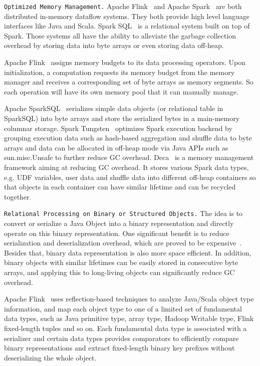 \vspace{5pt}
\texttt {Optimized Memory Management.} 
Apache Flink~\cite{alexandrov2014stratosphere} and Apache
Spark~\cite{zaharia2012resilient} are both distributed in-memory
dataflow systems. They both provide high level language interfaces like Java and Scala.
Spark SQL~\cite{armbrust2015spark} is a relational system built on top
of Spark. Those systems all have the
ability to alleviate the garbage collection overhead  by storing data
into byte arrays or even storing data off-heap.

Apache Flink~\cite{alexandrov2014stratosphere} assigns memory budgets to its data processing operators. Upon
initialization, a computation requests its memory budget from the
memory manager and receives a corresponding set of byte arrays as memory segments. So
each operation will have its own memory pool that it can manually
manage. 

Apache SparkSQL~\cite{armbrust2015spark} serializes simple data objects (or
relational table in SparkSQL) into byte arrays and store the serialized bytes
in a main-memory columnar storage. Spark Tungsten~\cite{tungsten}
optimizes Spark execution backend by grouping execution
data such as hash-based aggregation and shuffle data
to byte arrays and data can be allocated in off-heap mode via
Java APIs such as sun.misc.Unsafe to
further reduce GC overhead. Deca~\cite{lu2016lifetime} is a memory management framework aiming at
reducing GC overhead. It stores
various Spark data types, e.g. UDF variables, user data and
shuffle data into different
off-heap containers so that objects in each container can have similar
lifetime and can be recycled together.

\vspace{5pt}
\texttt {Relational Processing on Binary or Structured Objects.} The idea is to convert or
serialize a Java Object into a binary representation and directly
operate on this binary representation. One significant benefit is to reduce serialization and
deserialization overhead, which are proved to be expensive~\cite{ousterhout2015making}. 
Besides that, binary data representation is also more space efficient. In addition, binary objects
with similar lifetimes can be easily stored in consecutive byte
arrays, and applying this to long-living objects can significantly reduce GC overhead.

Apache Flink~\cite{alexandrov2014stratosphere} uses reflection-based
techniques to analyze Java/Scala object type information, and
map each object type to one of a limited set of
fundamental data types, such as Java primitive type, array type,
Hadoop Writable type, Flink fixed-length tuples and so on. Each
fundamental data type is associated with a serializer and certain data
types provides comparators to efficiently compare binary
representations and extract fixed-length binary key prefixes without
deserializing the whole object.

